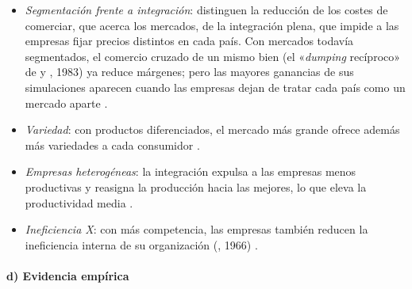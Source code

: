 \documentclass[11pt]{article}
\begin{document}
\begin{itemize}
\item \emph{Segmentación frente a integración}: \textcite{SmithVenables1988Completing} distinguen la reducción de los costes de comerciar, que acerca los mercados, de la integración plena, que impide a las empresas fijar precios distintos en cada país. Con mercados todavía segmentados, el comercio cruzado de un mismo bien (el «\emph{dumping} recíproco» de  y , 1983) ya reduce márgenes; pero las mayores ganancias de sus simulaciones aparecen cuando las empresas dejan de tratar cada país como un mercado aparte .
\item \emph{Variedad}: con productos diferenciados, el mercado más grande ofrece además más variedades a cada consumidor .
\item \emph{Empresas heterogéneas}: la integración expulsa a las empresas menos productivas y reasigna la producción hacia las mejores, lo que eleva la productividad media .
\item \emph{Ineficiencia X}: con más competencia, las empresas también reducen la ineficiencia interna de su organización (, 1966) .
\end{itemize}

\paragraph{d) Evidencia empírica}
\end{document}
